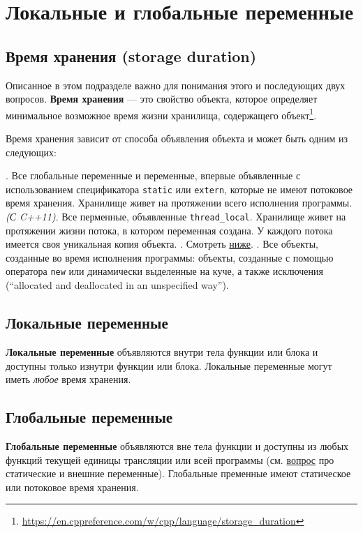 \documentclass[14pt, a4paper]{extarticle}
\begin{document}

\section{Локальные и глобальные переменные}
\subsection*{Время хранения (storage duration)}
Описанное в этом подразделе важно для понимания этого и последующих двух вопросов.
\textbf{Время хранения} --- это свойство объекта, которое определяет минимальное
возможное время жизни хранилища, содержащего объект\footnote{\url{https://en.cppreference.com/w/cpp/language/storage_duration}}.

Время хранения зависит от способа объявления объекта и может быть одним из следующих:
\begin{itemize}
  . Все глобальные переменные и переменные, впервые объявленные с использованием
  спецификатора \verb|static| или \verb|extern|, которые не имеют потоковое время хранения.
  Хранилище живет на протяжении всего исполнения программы.
   {\small\textit{(С C++11)}}. Все перменные, объявленные \verb|thread_local|.
  Хранилище живет на протяжении жизни потока, в котором переменная создана. У каждого потока имеется
  своя уникальная копия объекта.
  . Смотреть \hyperref[def:auto_storage]{ниже}.
  . Все объекты, созданные во время исполнения программы:
  объекты, созданные с помощью оператора \verb|new| или динамически выделенные на куче,
  а также исключения (``allocated and deallocated in an unspecified way'').
\end{itemize}

\subsection*{Локальные переменные}
\textbf{Локальные переменные} объявляются внутри тела функции или блока и доступны только изнутри
функции или блока. Локальные переменные могут иметь \textit{любое} время хранения.

\subsection*{Глобальные переменные}
\textbf{Глобальные переменные} объявляются вне тела функции и доступны из любых функций
текущей единицы трансляции или всей программы (см. \hyperref[sec:ext_stat]{вопрос} про
статические и внешние переменные).
Глобальные пременные имеют статическое или потоковое время хранения.
\end{document}
